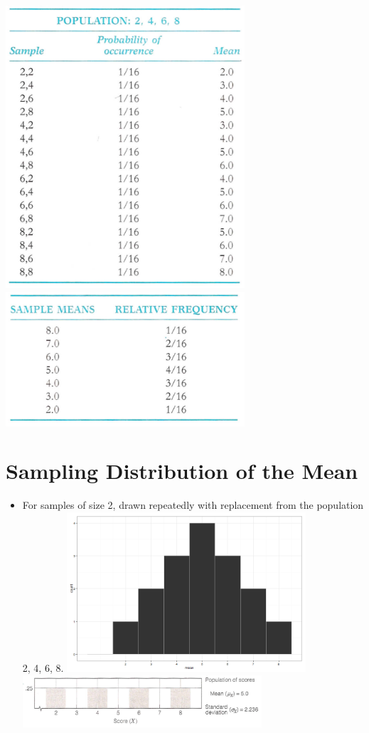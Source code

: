 \documentclass[12pt]{article}
\begin{document}
\includegraphics[width=3.5in]{sample_dist_outcomes.png}
\includegraphics[width=3.5in]{sample_dist_meanout.png}

\section{Sampling Distribution of the
Mean}\label{sampling-distribution-of-the-mean}

\begin{itemize}
\itemsep1pt\parskip0pt
\item
  For samples of size 2, drawn repeatedly with replacement from the
  population 2, 4, 6, 8. \includegraphics[width=3.5in]{figure/sampdist-1.png}
  \includegraphics[width=3.5in]{sample_dist_population.png}
\end{itemize}
\end{document}
